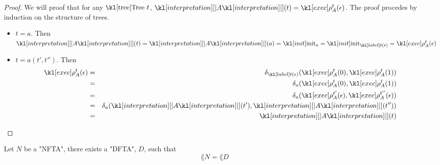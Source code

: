 \documentclass{article}
\begin{document}
\begin{proof}
	We will proof that for any $\tree \ t$, $\interpret A (t) = \exec A t (\epsilon)$.
	The proof procedes by induction on the structure of trees.
	\begin{itemize}
		\item $t = a$. Then
		      $\interpret A (t) = \interpret A (a)=  \init_a = \init_{\tlabel t {\epsilon}} = \exec A t (\epsilon)$
		\item $t = a(t',t'')$. Then
		      \begin{eqnarray*}
			      \exec A t (\epsilon)  &=& \delta_{\tlabel t {\epsilon}}(\exec A t (0), \exec A t (1)) \\
			      &=& \delta_a (\exec A t (0), \exec A t (1)) \\
			      &=& \delta_a (\exec A {t'}(\epsilon), \exec A {t''} (\epsilon)) \\
			      &=& \delta_a (\interpret A (t'), \interpret A (t'')) \\
			      &=& \interpret A (t)
		      \end{eqnarray*}
	\end{itemize}
\end{proof}

\begin{theorem}
	Let $N$ be a "NFTA", there exists a "DFTA", $D$, such that
	$$\lang N = \lang D$$
\end{theorem}
\end{document}
